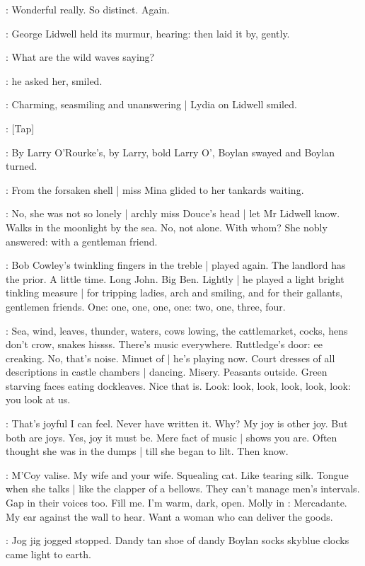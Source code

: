\lidwell:
Wonderful really.
So distinct.
Again.

:
George Lidwell held its murmur,
hearing:
then laid it by,
gently.

\lidwell:
What are the wild waves saying?

:
he asked her,
smiled.

:
Charming,
seasmiling and unanswering |
Lydia on Lidwell smiled.

\stripling:
[Tap]

:
By Larry O'Rourke's,
by Larry,
bold Larry O',
Boylan swayed
and Boylan turned.

:
From the forsaken shell |
miss Mina glided to her tankards waiting.

:
No,
she was not so lonely |
archly miss Douce's head |
let Mr Lidwell know.
Walks in the moonlight by the sea.
No,
not alone.
With whom?
She nobly answered:
with a gentleman friend.

:
Bob Cowley's twinkling fingers in the treble |
played again.
The landlord has the prior.
A little time.
Long John.
Big Ben.
Lightly |
he played a light bright tinkling measure |
for tripping ladies,
arch and smiling,
and for their gallants,
gentlemen friends.
One:
one,
one,
one,
one:
two,
one,
three,
four.

\BloomInt:
Sea,
wind,
leaves,
thunder,
waters,
cows lowing,
the cattlemarket,
cocks,
hens don't crow,
snakes hissss.
There's music everywhere.
Ruttledge's door:
ee creaking.
No,
that's noise.
Minuet of  |
he's playing now.
Court dresses of all descriptions in castle chambers |
dancing.
Misery.
Peasants outside.
Green starving faces eating dockleaves.
Nice that is.
Look:
look,
look,
look,
look,
look:
you look at us.

\BloomInt:
That's joyful I can feel.
Never have written it.
Why?
My joy is other joy.
But both are joys.
Yes,
joy it must be.
Mere fact of music |
shows you are.
Often thought she was in the dumps |
till she began to lilt.
Then know.

\BloomInt:
M'Coy valise.
My wife and your wife.
Squealing cat.
Like tearing silk.
Tongue when she talks |
like the clapper of a bellows.
They can't manage men's intervals.
Gap in their voices too.
Fill me.
I'm warm,
dark,
open.
Molly in :
Mercadante.
My ear against the wall to hear.
Want a woman who can deliver the goods.

:
Jog jig jogged stopped.
Dandy tan shoe of dandy Boylan socks
skyblue clocks came light to earth.

